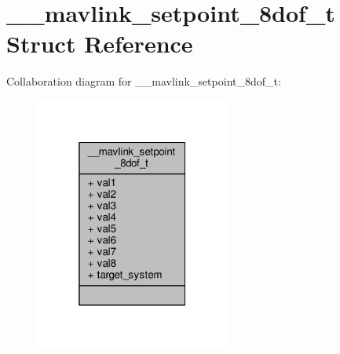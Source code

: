 \hypertarget{struct____mavlink__setpoint__8dof__t}{\section{\+\_\+\+\_\+mavlink\+\_\+setpoint\+\_\+8dof\+\_\+t Struct Reference}
\label{struct____mavlink__setpoint__8dof__t}
}


Collaboration diagram for \+\_\+\+\_\+mavlink\+\_\+setpoint\+\_\+8dof\+\_\+t\+:
\nopagebreak
\begin{figure}[H]
\begin{center}
\leavevmode
\includegraphics[width=181pt]{struct____mavlink__setpoint__8dof__t__coll__graph}
\end{center}
\end{figure}
